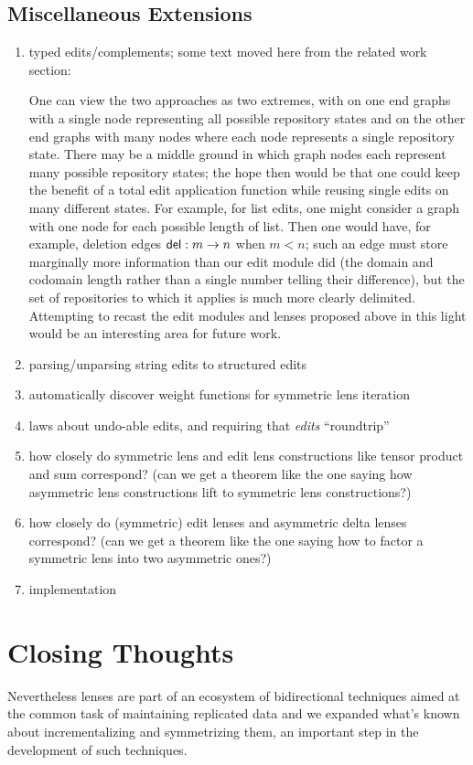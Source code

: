 \subsection{Miscellaneous Extensions}
\label{sec:future-misc}
\begin{enumerate}
    \item typed edits/complements; some text moved here from the related
        work section:

        One can view the two approaches as two extremes, with on one end
        graphs with a single node representing all possible repository
        states and on the other end graphs with many nodes where each node
        represents a single repository state. There may be a middle ground
        in which graph nodes each represent many possible repository states;
        the hope then would be that one could keep the benefit of a total
        edit application function while reusing single edits on many
        different states. For example, for list edits, one might consider a
        graph with one node for each possible length of list. Then one would
        have, for example, deletion edges $\mathsf{del} : m \to n$ when
        $m<n$; such an edge must store marginally more information than our
        edit module did (the domain and codomain length rather than a single
        number telling their difference), but the set of repositories to
        which it applies is much more clearly delimited. Attempting to
        recast the edit modules and lenses proposed above in this light
        would be an interesting area for future work.
    \item parsing/unparsing string edits to structured edits
    \item automatically discover weight functions for symmetric lens
        iteration
    \item laws about undo-able edits, and requiring that \emph{edits} ``roundtrip''
    \item how closely do symmetric lens and edit lens constructions like
        tensor product and sum correspond? (can we get a theorem like the
        one saying how asymmetric lens constructions lift to symmetric lens
        constructions?)
    \item how closely do (symmetric) edit lenses and asymmetric delta lenses
        correspond? (can we get a theorem like the one saying how to
        factor a symmetric lens into two asymmetric ones?)
    \item implementation
\end{enumerate}

\section{Closing Thoughts}
\label{sec:closing}
Nevertheless lenses are part of an ecosystem of bidirectional techniques
aimed at the common task of maintaining replicated data and we expanded
what's known about incrementalizing and symmetrizing them, an important step
in the development of such techniques.
